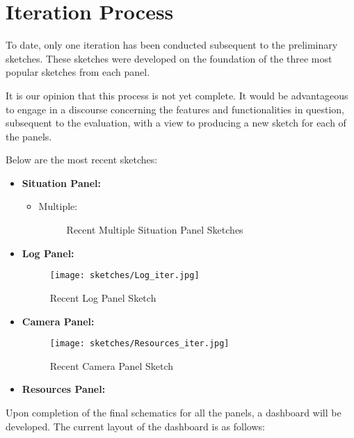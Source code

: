 \section{Iteration Process}
To date, only one iteration has been conducted subsequent to the preliminary sketches. These sketches were developed on the foundation of the three most popular sketches from each panel. \par
It is our opinion that this process is not yet complete. It would be advantageous to engage in a discourse concerning the features and functionalities in question, subsequent to the evaluation, with a view to producing a new sketch for each of the panels. \par
Below are the most recent sketches:
\begin{itemize}
    \item \textbf{Situation Panel:}
        \begin{itemize}
            \item Multiple: 
                \begin{figure}[H]
                    \centerline{%
                    \hfill
                    }
                \caption{Recent Multiple Situation Panel Sketches}
                \end{figure}
        \end{itemize}
    \item \textbf{Log Panel:}
        \begin{figure}[H]
            \centering
            \texttt{[image: sketches/Log\_iter.jpg]}
            \caption{Recent Log Panel Sketch}
        \end{figure}
    \item \textbf{Camera Panel:}
        \begin{figure}[H]
        \centering
        \texttt{[image: sketches/Resources\_iter.jpg]}
        \caption{Recent Camera Panel Sketch}
    \end{figure}
    \item \textbf{Resources Panel:}
\end{itemize} \par 
Upon completion of the final schematics for all the 
panels, a dashboard will be developed. The current layout 
of the dashboard is as follows:
